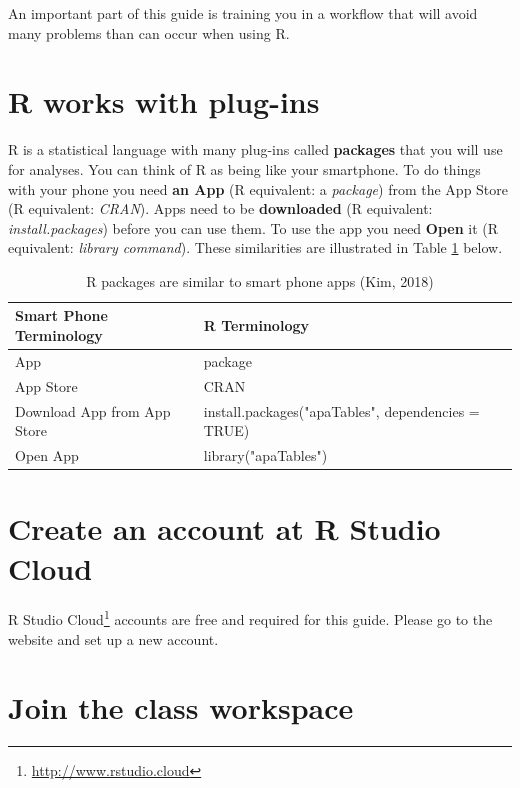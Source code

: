 \documentclass[
]{krantz}
\renewcommand{\href}[2]{#2\footnote{\url{#1}}}
\begin{document}
An important part of this guide is training you in a workflow that will avoid many problems than can occur when using R.

\hypertarget{r-works-with-plug-ins}{%
\section{R works with plug-ins}\label{r-works-with-plug-ins}}

R is a statistical language with many plug-ins called \textbf{packages} that you will use for analyses. You can think of R as being like your smartphone. To do things with your phone you need \textbf{an App} (R equivalent: a \emph{package}) from the App Store (R equivalent: \emph{CRAN}). Apps need to be \textbf{downloaded} (R equivalent: \emph{install.packages}) before you can use them. To use the app you need \textbf{Open} it (R equivalent: \emph{library command}). These similarities are illustrated in Table \ref{tab:appstore} below.

\begin{table}

\caption{\label{tab:appstore}R packages are similar to smart phone apps (Kim, 2018)}
\centering
\begin{tabular}[t]{ll}
\toprule
Smart Phone Terminology & R Terminology\\
\midrule
App & package\\
App Store & CRAN\\
Download App from App Store & install.packages("apaTables", dependencies = TRUE)\\
Open App & library("apaTables")\\
\bottomrule
\end{tabular}
\end{table}

\hypertarget{create-an-account-at-r-studio-cloud}{%
\section{Create an account at R Studio Cloud}\label{create-an-account-at-r-studio-cloud}}

\href{http://www.rstudio.cloud}{R Studio Cloud} accounts are free and required for this guide. Please go to the website and set up a new account.

\hypertarget{join-the-class-workspace}{%
\section{Join the class workspace}\label{join-the-class-workspace}}
\end{document}
